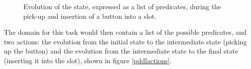 \begin{figure}[ht]



    \caption{Evolution of the state, expressed as a list of predicates, during the pick-up and insertion of a button into a slot.}
    \label{predicatesevolutions}
\end{figure}

The domain for this task would then contain a list of the possible predicates, and two actions: the evolution from the initial state to the intermediate state (picking up the button) and the evolution from the intermediate state to the final state (inserting it into the slot), shown in figure \ref{pddlactions}.

